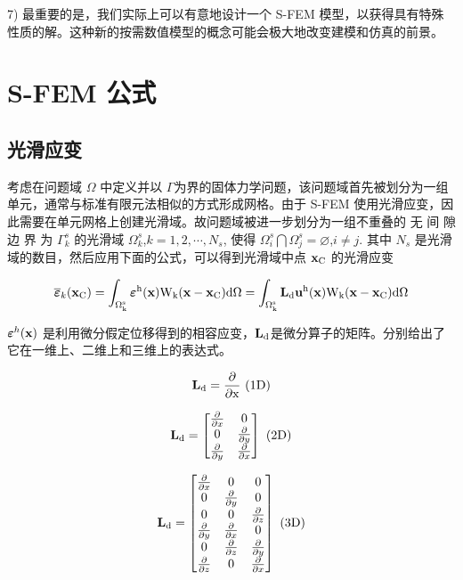 \documentclass[12pt,a4paper]{article}
\begin{document}
7) 最重要的是，我们实际上可以有意地设计一个 S-FEM 模型，以获得具有特殊性质的解。这种新的按需数值模型的概念可能会极大地改变建模和仿真的前景。

\section{S-FEM 公式}
\subsection{光滑应变}
考虑在问题域 $\Omega$ 中定义并以 $\Gamma$为界的固体力学问题，该问题域首先被划分为一组单元，通常与标准有限元法相似的方式形成网格。由于 S-FEM 使用光滑应变，因此需要在单元网格上创建光滑域。故问题域被进一步划分为一组不重叠的
无 间 隙 边 界 为 $\Gamma ^s _k$ 的光滑域 $\Omega ^s _k$,$k = 1,2,\cdots ,N_s$, 使得
$\Omega ^s _i \bigcap \Omega ^s _j = \varnothing$,$i\neq j$.
其中 $N_s$ 是光滑域的数目，然后应用下面的公式，可以得到光滑域中点 $\rm\textbf{x}_C$ 的光滑应变

\begin{equation}
\overline{\boldsymbol{\varepsilon}}_k (\rm\textbf{x}_C)=\int_{\Omega ^s_k}^{} \boldsymbol{\varepsilon}^h (\rm\textbf{x}) W_k (\rm\textbf{x}-
\rm\textbf{x}_C) \mathrm{d}\Omega=\int_{\Omega ^s_k}^{} \rm\textbf{L}_d \rm\textbf{u}^h (\rm\textbf{x})W_k (\rm\textbf{x}-
\rm\textbf{x}_C) \mathrm{d}\Omega
\end{equation}

$\boldsymbol{\varepsilon}^h (\rm\textbf{x})$ 是利用微分假定位移得到的相容应变，$\rm\textbf{L}_d$是微分算子的矩阵。分别给出了它在一维上、二维上和三维上的表达式。

$$
\rm\textbf{L}_d = \frac{\partial}{\partial x}~(1D)
$$

$$
\rm\textbf{L}_d = 
\begin{bmatrix}
\frac{\partial}{\partial x} & 0 \\
0 & \frac{\partial}{\partial y} \\
\frac{\partial}{\partial y}  & \frac{\partial}{\partial x}
\end{bmatrix}~(2D)
$$

\begin{equation}
\rm\textbf{L}_d = 
\begin{bmatrix}
\frac{\partial}{\partial x} & 0 & 0 \\
0 & \frac{\partial}{\partial y} & 0 \\
0 & 0 & \frac{\partial}{\partial z} \\
\frac{\partial}{\partial y}  & \frac{\partial}{\partial x} & 0 \\
0 & \frac{\partial}{\partial z} & \frac{\partial}{\partial y} \\
\frac{\partial}{\partial z} & 0 & \frac{\partial}{\partial x} \\
\end{bmatrix}~(3D)
\end{equation}
\end{document}
